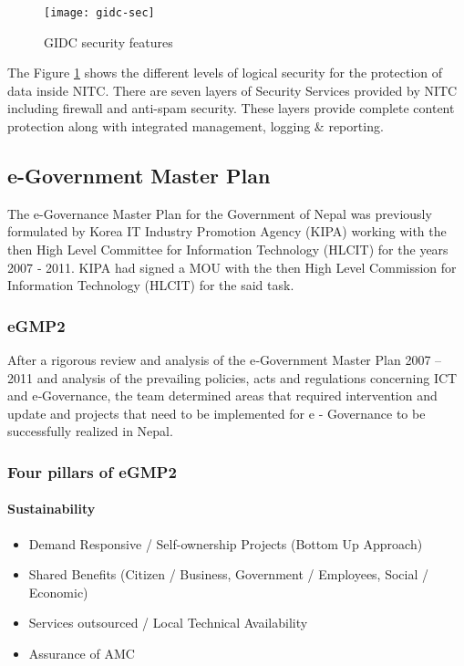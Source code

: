 \begin{figure}[tph]
	\centering
	\texttt{[image: gidc-sec]}
	\caption{GIDC security features}
	\label{fig:gidc-sec}
\end{figure}

The Figure \ref{fig:gidc-sec} shows the different
levels of logical security for the
protection of data inside NITC. There
are seven layers of Security Services
provided by NITC including firewall
and anti-spam security. These layers
provide complete content protection
along with integrated management,
logging \& reporting.

\subsection{e-Government Master Plan}
The e-Governance Master Plan for the Government of Nepal was previously
formulated by Korea IT Industry Promotion Agency (KIPA) working with the then High Level Committee for
Information Technology (HLCIT) for the years 2007 ‐ 2011. KIPA had signed a MOU with the then High Level Commission for Information Technology (HLCIT) for the said task.

\subsubsection*{eGMP2}
After a rigorous review and analysis of the e‐Government Master Plan 2007 -- 2011 and analysis of the prevailing
policies, acts and regulations concerning ICT and e‐Governance, the team determined areas that required
intervention and update and projects that need to be implemented for e ‐ Governance to be successfully realized in
Nepal.

\subsubsection*{Four pillars of eGMP2}
\paragraph*{Sustainability}
\begin{itemize}
	\item Demand Responsive / Self-ownership Projects (Bottom Up Approach)
	\item Shared Benefits (Citizen / Business, Government / Employees, Social / Economic)
	\item Services outsourced / Local Technical Availability
	\item Assurance of AMC 
\end{itemize}

